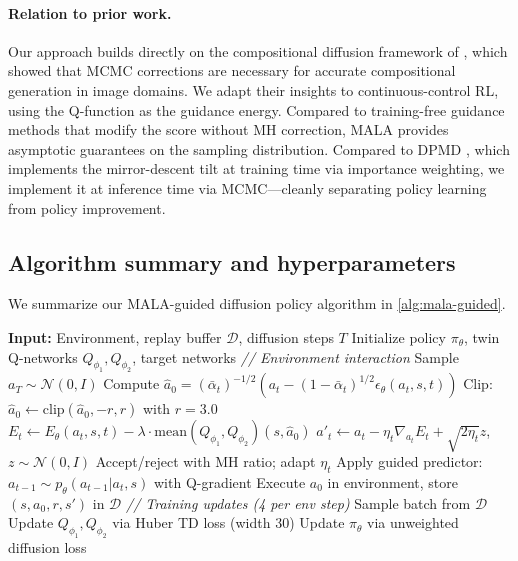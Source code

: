 \documentclass{article}
\theoremstyle{plain}
\theoremstyle{definition}
\theoremstyle{remark}
\begin{document}
\paragraph{Relation to prior work.}
Our approach builds directly on the compositional diffusion framework of \citet{du2023reduce_reuse_recycle}, which showed that MCMC corrections are necessary for accurate compositional generation in image domains.
We adapt their insights to continuous-control RL, using the Q-function as the guidance energy.
Compared to training-free guidance methods \citep{ye2024tfg,bansal2023universal} that modify the score without MH correction, MALA provides asymptotic guarantees on the sampling distribution.
Compared to DPMD \citep{ma2025soft}, which implements the mirror-descent tilt at training time via importance weighting, we implement it at inference time via MCMC---cleanly separating policy learning from policy improvement.

\subsection{Algorithm summary and hyperparameters}
\label{sec:algorithm}

We summarize our MALA-guided diffusion policy algorithm in \cref{alg:mala-guided}.

\begin{algorithm}[t]
\caption{MALA-Guided Mirror Descent (MGMD)}
\label{alg:mala-guided}
\begin{algorithmic}[1]
\STATE \textbf{Input:} Environment, replay buffer $\mathcal{D}$, diffusion steps $T$
\STATE Initialize policy $\pi_\theta$, twin Q-networks $Q_{\phi_1}, Q_{\phi_2}$, target networks
  \STATE \textit{// Environment interaction}
  \STATE Sample $a_T \sim \mathcal{N}(0, I)$
    \STATE Compute $\hat{a}_0 = (\bar{\alpha}_t)^{-1/2}(a_t - (1-\bar{\alpha}_t)^{1/2}\epsilon_\theta(a_t, s, t))$
    \STATE Clip: $\hat{a}_0 \leftarrow \text{clip}(\hat{a}_0, -r, r)$ with $r=3.0$
      \STATE $E_t \leftarrow E_\theta(a_t, s, t) - \lambda \cdot \text{mean}(Q_{\phi_1}, Q_{\phi_2})(s, \hat{a}_0)$
      \STATE $a'_t \leftarrow a_t - \eta_t \nabla_{a_t} E_t + \sqrt{2\eta_t} z$, $z \sim \mathcal{N}(0,I)$
      \STATE Accept/reject with MH ratio; adapt $\eta_t$
    \ENDFOR
    \STATE Apply guided predictor: $a_{t-1} \sim p_\theta(a_{t-1} | a_t, s)$ with Q-gradient
  \ENDFOR
  \STATE Execute $a_0$ in environment, store $(s, a_0, r, s')$ in $\mathcal{D}$
  \STATE \textit{// Training updates (4 per env step)}
    \STATE Sample batch from $\mathcal{D}$
    \STATE Update $Q_{\phi_1}, Q_{\phi_2}$ via Huber TD loss (width 30)
    \STATE Update $\pi_\theta$ via unweighted diffusion loss
  \ENDFOR
\ENDFOR
\end{algorithmic}
\end{algorithm}
\end{document}
